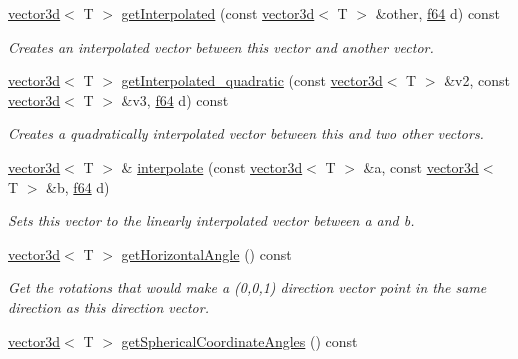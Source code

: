 \begin{DoxyCompactItemize}
\hyperlink{classirr_1_1core_1_1vector3d}{vector3d}$<$ T $>$ \hyperlink{classirr_1_1core_1_1vector3d_ab0ad2c732121c2b6e36c2c2e9ed715fd}{get\+Interpolated} (const \hyperlink{classirr_1_1core_1_1vector3d}{vector3d}$<$ T $>$ \&other, \hyperlink{namespaceirr_a1325b02603ad449f92c68fc640af9b28}{f64} d) const 
\begin{DoxyCompactList}\small\item\em Creates an interpolated vector between this vector and another vector. \end{DoxyCompactList}\item 
\hyperlink{classirr_1_1core_1_1vector3d}{vector3d}$<$ T $>$ \hyperlink{classirr_1_1core_1_1vector3d_adb749559ee0941687d4692941146a388}{get\+Interpolated\+\_\+quadratic} (const \hyperlink{classirr_1_1core_1_1vector3d}{vector3d}$<$ T $>$ \&v2, const \hyperlink{classirr_1_1core_1_1vector3d}{vector3d}$<$ T $>$ \&v3, \hyperlink{namespaceirr_a1325b02603ad449f92c68fc640af9b28}{f64} d) const 
\begin{DoxyCompactList}\small\item\em Creates a quadratically interpolated vector between this and two other vectors. \end{DoxyCompactList}\item 
\hyperlink{classirr_1_1core_1_1vector3d}{vector3d}$<$ T $>$ \& \hyperlink{classirr_1_1core_1_1vector3d_a32a888e0f608a20deee98c794a321c4c}{interpolate} (const \hyperlink{classirr_1_1core_1_1vector3d}{vector3d}$<$ T $>$ \&a, const \hyperlink{classirr_1_1core_1_1vector3d}{vector3d}$<$ T $>$ \&b, \hyperlink{namespaceirr_a1325b02603ad449f92c68fc640af9b28}{f64} d)
\begin{DoxyCompactList}\small\item\em Sets this vector to the linearly interpolated vector between a and b. \end{DoxyCompactList}\item 
\hyperlink{classirr_1_1core_1_1vector3d}{vector3d}$<$ T $>$ \hyperlink{classirr_1_1core_1_1vector3d_a9485549addf9967247d3431c7746fbda}{get\+Horizontal\+Angle} () const 
\begin{DoxyCompactList}\small\item\em Get the rotations that would make a (0,0,1) direction vector point in the same direction as this direction vector. \end{DoxyCompactList}\item 
\hyperlink{classirr_1_1core_1_1vector3d}{vector3d}$<$ T $>$ \hyperlink{classirr_1_1core_1_1vector3d_aab6d3c2dc082d8142c7ac4da8625f93a}{get\+Spherical\+Coordinate\+Angles} () const 

\end{DoxyCompactItemize}
